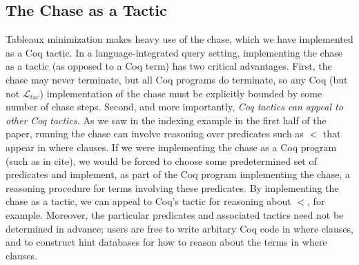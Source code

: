 \documentclass[preprint]{sigplanconf}
\newcommand{\ltac}[0]{\ensuremath{\mathcal{L}_{\mathrm{tac}}}}
\begin{document}
\begin{comment}

The final result of normalization for the movies query is exactly the query presented in Section~\ref{sec:example}.
In our syntax:
\begin{coq}
query (Mstr Movies Movies)
      (fun x => (fst x).(title) ?[=] (snd x).(title))
      (fun x => ((fst x).(director), (snd x).(actor)))
\end{coq}
\end{comment}


\subsection{The Chase as a Tactic}
\label{sec:ltac-chase}

Tableaux minimization makes heavy use of the chase, which we have implemented as a Coq tactic.  In a language-integrated query setting, implementing the chase as a tactic (as opposed to a Coq term) has two critical advantages.  First, the chase may never terminate, but all Coq programs do terminate, so any Coq (but not \ltac{}) implementation of the chase must be explicitly bounded by some number of chase steps.  Second, and more importantly, {\it Coq tactics can appeal to other Coq tactics.}  As we saw in the indexing example in the first half of the paper, running the chase can involve reasoning over predicates such as $<$ that appear in where clauses.  If we were implementing the chase as a Coq program (such as in cite), we would be forced to choose some predetermined set of predicates and implement, as part of the Coq program implementing the chase, a reasoning procedure for terms involving these predicates.  By implementing the chase as a tactic, we can appeal to Coq's  tactic for reasoning about $<$, for example.  Moreover, the particular predicates and associated tactics need not be determined in advance; users are free to write arbitary Coq code in where clauses, and to construct hint databases for how to reason about the terms in where clauses.  
\end{document}
